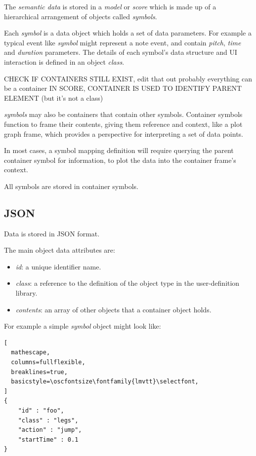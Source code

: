 \documentclass{article}
\def\oscfontsize{\footnotesize}
\begin{document}
The \textit{semantic data} is stored in a \textit{model} or \textit{score} which is made up of a hierarchical arrangement of objects called \textit{symbols}.

Each \textit{symbol} is a data object which holds a set of data parameters. For example a typical event like \textit{symbol} might represent a note event, and contain \textit{pitch},  \textit{time} and \textit{duration} parameters. The details of each symbol's data structure and UI interaction is defined in an object \textit{class}.

CHECK IF CONTAINERS STILL EXIST, edit that out probably
everything can be a container
IN SCORE, CONTAINER IS USED TO IDENTIFY PARENT ELEMENT (but it's not a class)


\textit{symbols} may also be containers that contain other symbols. Container symbols function to frame their contents, giving them reference and context, like a plot graph frame, which provides a perspective for interpreting a set of data points.

In most cases, a symbol mapping definition will require querying the parent container symbol for information, to plot the data into the container frame's context. 

All symbols are stored in container symbols.
\subsection{JSON}\label{subsec:json}

Data is stored in JSON format.

The main object data attributes are:
\begin{itemize}\itemsep0pt %
\item \textit{id}: a unique identifier name.
\item \textit{class}: a reference to the definition of the object type in the user-definition library.
\item \textit{contents}: an array of other objects that a container object holds.
\end{itemize}

For example a simple \textit{symbol} object might look like:


\begin{lstlisting}[
  mathescape,
  columns=fullflexible,
  breaklines=true,
  basicstyle=\oscfontsize\fontfamily{lmvtt}\selectfont,
]
{
    "id" : "foo",
    "class" : "legs",
    "action" : "jump",
    "startTime" : 0.1
}
\end{lstlisting}
\end{document}
